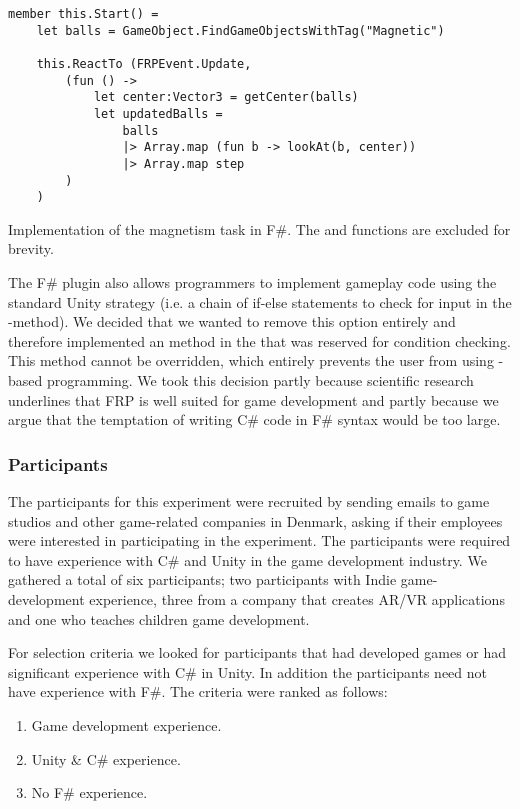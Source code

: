 \begin{listing}[H]
    \begin{verbatim}
member this.Start() = 
    let balls = GameObject.FindGameObjectsWithTag("Magnetic")

    this.ReactTo (FRPEvent.Update,
        (fun () -> 
            let center:Vector3 = getCenter(balls)
            let updatedBalls = 
                balls
                |> Array.map (fun b -> lookAt(b, center))
                |> Array.map step
        )
    )
    \end{verbatim}
    \caption{Implementation of the magnetism task in F\#. The  and  functions are excluded for brevity.}
    \label{lst:frp:example}
\end{listing}

The F\# plugin also allows programmers to implement gameplay code using the standard Unity strategy (i.e. a chain of if-else statements to check for input in the -method). We decided that we wanted to remove this option entirely and therefore implemented an  method in the  that was reserved for condition checking. This method cannot be overridden, which entirely prevents the user from using -based programming. We took this decision partly because scientific research underlines that \gls{FRP} is well suited for game development\cite{courtney2003yampa,cheong2005functional,maraffi:frp} and partly because we argue that the temptation of writing C\# code in F\# syntax would be too large.

\subsubsection{Participants} \label{sec:par-crit}
The participants for this experiment were recruited by sending emails to game studios and other game-related companies in Denmark, asking if their employees were interested in participating in the experiment. The participants were required to have experience with C\# and Unity in the game development industry. We gathered a total of six participants; two participants with Indie game-development experience, three from a company that creates \gls{AR}/\gls{VR} applications and one who teaches children game development.

For selection criteria we looked for participants that had developed games or had significant experience with C\# in Unity. In addition the participants need not have experience with F\#. The criteria were ranked as follows:
\begin{enumerate}
	\item Game development experience.
	\item Unity \& C\# experience.
	\item No F\# experience.
\end{enumerate}

